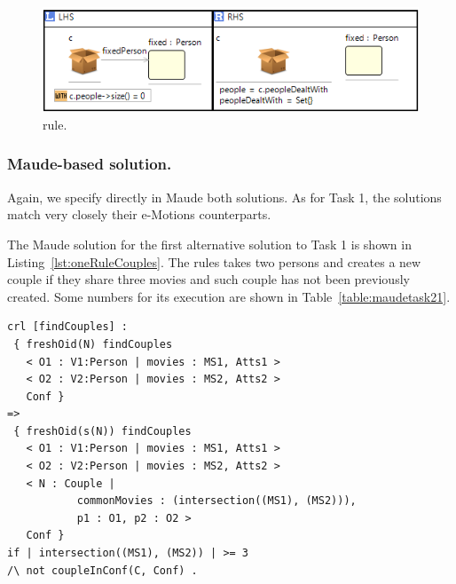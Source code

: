 \begin{figure}[htp]
  \centering
  \includegraphics[width=.9\textwidth]{imgs/nextPerson}
  \caption{ rule.}\label{fig:nextPerson}
\end{figure}



\subsubsection{Maude-based solution.}

Again, we specify directly in Maude both solutions. As for Task 1, the solutions match very closely their e-Motions counterparts. 

The Maude solution for the first alternative solution to Task 1 is shown in Listing~\ref{lst:oneRuleCouples}. The rules takes two persons and creates a new couple if they share three movies and such couple has not been previously created. Some numbers for its execution are shown in Table~\ref{table:maudetask21}.
 
\begin{lstlisting}[caption=\code{createCouples} Maude rule., label=lst:oneRuleCouples]
crl [findCouples] :
 { freshOid(N) findCouples
   < O1 : V1:Person | movies : MS1, Atts1 >
   < O2 : V2:Person | movies : MS2, Atts2 > 
   Conf }
=>
 { freshOid(s(N)) findCouples
   < O1 : V1:Person | movies : MS1, Atts1 >
   < O2 : V2:Person | movies : MS2, Atts2 >
   < N : Couple | 
           commonMovies : (intersection((MS1), (MS2))),
           p1 : O1, p2 : O2 > 
   Conf }
if | intersection((MS1), (MS2)) | >= 3
/\ not coupleInConf(C, Conf) .
\end{lstlisting}


